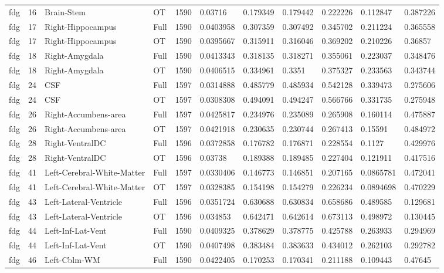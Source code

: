 \begin{landscape}
\begin{longtable}{lllllllllll}
fdg & 16 & Brain-Stem & OT & 1590 & 0.03716 & 0.179349 & 0.179442 & 0.222226 & 0.112847 & 0.387226 \\
fdg & 17 & Right-Hippocampus & Full & 1590 & 0.0403958 & 0.307359 & 0.307492 & 0.345702 & 0.211224 & 0.365558 \\
fdg & 17 & Right-Hippocampus & OT & 1590 & 0.0395667 & 0.315911 & 0.316046 & 0.369202 & 0.210226 & 0.36857 \\
fdg & 18 & Right-Amygdala & Full & 1590 & 0.0413343 & 0.318135 & 0.318271 & 0.355061 & 0.223037 & 0.348476 \\
fdg & 18 & Right-Amygdala & OT & 1590 & 0.0406515 & 0.334961 & 0.3351 & 0.375327 & 0.233563 & 0.343744 \\
fdg & 24 & CSF & Full & 1597 & 0.0314888 & 0.485779 & 0.485934 & 0.542128 & 0.339473 & 0.275606 \\
fdg & 24 & CSF & OT & 1597 & 0.0308308 & 0.494091 & 0.494247 & 0.566766 & 0.331735 & 0.275948 \\
fdg & 26 & Right-Accumbens-area & Full & 1597 & 0.0425817 & 0.234976 & 0.235089 & 0.265908 & 0.160114 & 0.475887 \\
fdg & 26 & Right-Accumbens-area & OT & 1597 & 0.0421918 & 0.230635 & 0.230744 & 0.267413 & 0.15591 & 0.484972 \\
fdg & 28 & Right-VentralDC & Full & 1596 & 0.0372858 & 0.176782 & 0.176871 & 0.228554 & 0.1127 & 0.429976 \\
fdg & 28 & Right-VentralDC & OT & 1596 & 0.03738 & 0.189388 & 0.189485 & 0.227404 & 0.121911 & 0.417516 \\
fdg & 41 & Left-Cerebral-White-Matter & Full & 1597 & 0.0330406 & 0.146773 & 0.146851 & 0.207165 & 0.0865781 & 0.472041 \\
fdg & 41 & Left-Cerebral-White-Matter & OT & 1597 & 0.0328385 & 0.154198 & 0.154279 & 0.226234 & 0.0894698 & 0.470229 \\
fdg & 43 & Left-Lateral-Ventricle & Full & 1596 & 0.0351724 & 0.630688 & 0.630834 & 0.658686 & 0.489585 & 0.129681 \\
fdg & 43 & Left-Lateral-Ventricle & OT & 1596 & 0.034853 & 0.642471 & 0.642614 & 0.673113 & 0.498972 & 0.130445 \\
fdg & 44 & Left-Inf-Lat-Vent & Full & 1590 & 0.0409325 & 0.378629 & 0.378775 & 0.425788 & 0.263933 & 0.294969 \\
fdg & 44 & Left-Inf-Lat-Vent & OT & 1590 & 0.0407498 & 0.383484 & 0.383633 & 0.434012 & 0.262103 & 0.292782 \\
fdg & 46 & Left-Cblm-WM & Full & 1590 & 0.0422405 & 0.170253 & 0.170341 & 0.211188 & 0.109443 & 0.47645 \\

\end{longtable}
\end{landscape}

